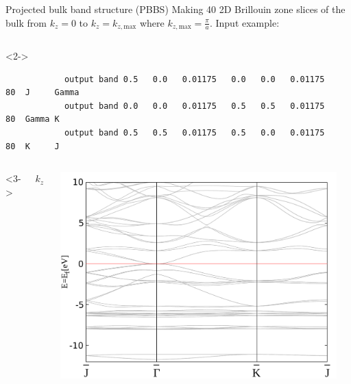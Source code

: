 \begin{frame}[fragile]{Projected bulk band structure (PBBS)}
	Making 40 2D Brillouin zone slices of the bulk from $k_z=0$ to $k_z=k_{z,\text{max}}$ where $k_{z,\text{max}}=\frac{\pi}{a}$. Input example:
	\vspace{-.3cm}
	\begin{columns} 
		\begin{column}<2->{\linewidth}\scriptsize{
			\begin{verbatim}
			output band 0.5   0.0   0.01175   0.0   0.0   0.01175    80  J     Gamma
			output band 0.0   0.0   0.01175   0.5   0.5   0.01175    80  Gamma K
			output band 0.5   0.5   0.01175   0.5   0.0   0.01175    80  K     J
			\end{verbatim} }
		\end{column}
	\end{columns}
	\begin{columns}<3->
		\begin{column}{.165\linewidth} \scriptsize{
				$k_z=0$}
		\end{column} \hspace{-.5cm}
		\begin{column}{.33\linewidth}
			\centering
			\includegraphics[width=\linewidth]{andere_bilder/0_bulk_-12_10.pdf}
		\end{column}
		\begin{column}{.33\linewidth}

\end{column}
\end{columns}
\end{frame}
